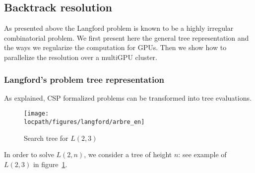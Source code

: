 %
%
%

\subsection{Backtrack resolution}

As presented above the Langford problem is known to be a highly irregular combinatorial problem. 
We first present here the general tree representation and the ways we regularize the computation for GPUs.
Then we show how to parallelize the resolution over a multiGPU cluster.

\subsubsection{Langford's problem tree representation}
\label{sec:LGF_resolution}
As explained, CSP formalized problems can be transformed into tree evaluations. %

\begin{figure}[htb]
\centering
\texttt{[image: \\locpath/figures/langford/arbre\_en]}
\caption{Search tree for $L(2,3)$}
\label{fig:arbre}
\end{figure}

In order to solve $L(2,n)$, we consider a tree of height $n$: see example of $L(2,3)$ in figure~\ref{fig:arbre}.

